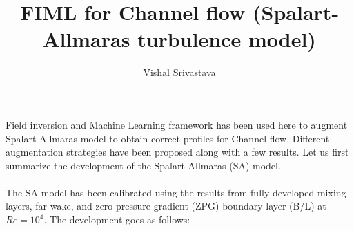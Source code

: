 \documentclass{article}
\title{FIML for Channel flow (Spalart-Allmaras turbulence model)}
\author{Vishal Srivastava}
\date{}
\begin{document}
\eject \pdfpagewidth=8.5in \pdfpageheight=11.5in
%
\maketitle
\noindent
%
Field inversion and Machine Learning framework has been used here to augment Spalart-Allmaras model to obtain correct profiles for Channel flow.
Different augmentation strategies have been proposed along with a few results. Let us first summarize the development of the Spalart-Allmaras (SA) model.
\\\\
The SA model has been calibrated using the results from fully developed mixing layers, far wake, and zero pressure gradient (ZPG) boundary layer (B/L) at
$Re=10^4$. The development goes as follows:
\end{document}
